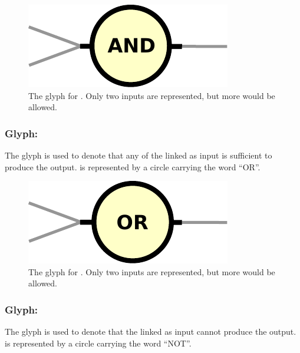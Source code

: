 \begin{figure}[htb]
  \centering
  \includegraphics[scale = 0.5]{le_images/and}
  \caption{The \PD glyph for . Only two inputs are represented, but more would be allowed.}
  \label{fig:and}
\end{figure}

\subsubsection{Glyph: }\label{sec:or}

The glyph  is used to denote that any of the  linked as input is sufficient to produce the output.  is represented by a circle carrying the word ``OR''.

\begin{figure}[htb]
  \centering
  \includegraphics[scale = 0.5]{le_images/or}
  \caption{The \PD glyph for . Only two inputs are represented, but more would be allowed.}
  \label{fig:or}
\end{figure}


\subsubsection{Glyph: }\label{sec:not}

The glyph  is used to denote that the  linked as input cannot produce the output.  is represented by a circle carrying the word ``NOT''.

